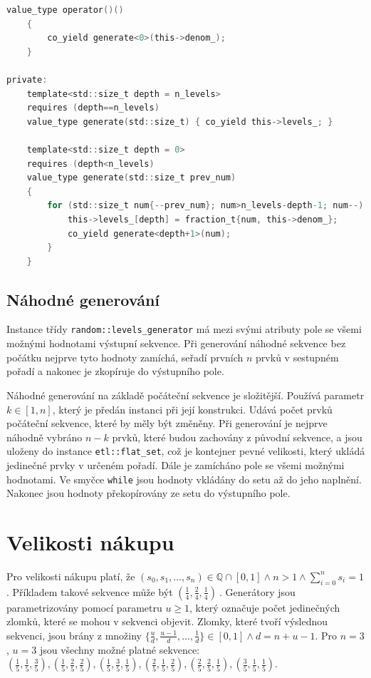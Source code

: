 \begin{lstlisting}[caption={~Metody pro systematické generování úrovní nákupu},label={lst:systematic:levels_generator},captionpos=t,abovecaptionskip=-\medskipamount,belowcaptionskip=\medskipamount,language=C]
    value_type operator()()
    {
        co_yield generate<0>(this->denom_);
    }

private:
    template<std::size_t depth = n_levels>
    requires (depth==n_levels)
    value_type generate(std::size_t) { co_yield this->levels_; }
    
    template<std::size_t depth = 0>
    requires (depth<n_levels)
    value_type generate(std::size_t prev_num)
    {
        for (std::size_t num{--prev_num}; num>n_levels-depth-1; num--) {
            this->levels_[depth] = fraction_t{num, this->denom_};
            co_yield generate<depth+1>(num);
        }
    }
\end{lstlisting}

\subsection{Náhodné generování}
Instance třídy \texttt{random::levels\_generator} má mezi svými atributy pole se všemi možnými hodnotami výstupní sekvence.
Při generování náhodné sekvence bez počátku nejprve tyto hodnoty zamíchá, seřadí prvních $n$ prvků v sestupném pořadí a nakonec je zkopíruje do výstupního pole.

Náhodné generování na základě počáteční sekvence je složitější.
Používá parametr $k \in [1, n] $, který je předán instanci při její konstrukci.
Udává počet prvků počáteční sekvence, které by měly být změněny.
Při generování je nejprve náhodně vybráno $n-k$ prvků, které budou zachovány z původní sekvence, a jsou uloženy do instance \texttt{etl::flat\_set}, což je kontejner pevné velikosti, který ukládá jedinečné prvky v určeném pořadí.
Dále je zamícháno pole se všemi možnými hodnotami.
Ve smyčce \texttt{while} jsou hodnoty vkládány do setu až do jeho naplnění.
Nakonec jsou hodnoty překopírovány ze setu do výstupního pole.

\section{Velikosti nákupu}
Pro velikosti nákupu platí, že $ (s_0, s_1,\dots,s_n) \in \mathbb{Q} \cap [0, 1] \land n>1 \land \sum_{i=0}^{n} s_i = 1 $.
Příkladem takové sekvence může být $ (\frac{1}{4}, \frac{2}{4}, \frac{1}{4})\ $.
Generátory jsou parametrizovány pomocí parametru $u\geq 1$, který označuje počet jedinečných zlomků, které se mohou v sekvenci objevit.
Zlomky, které tvoří výslednou sekvenci, jsou brány z množiny $\{\frac{u}{d}, \frac{u-1}{d},\dots, \frac{1}{d}\} \in [0, 1] \land d=n+u-1$.
Pro $n=3$, $u=3$ jsou všechny možné platné sekvence: $(\frac{1}{5}, \frac{1}{5}, \frac{3}{5}), (\frac{1}{5}, \frac{2}{5}, \frac{2}{5}), (\frac{1}{5}, \frac{3}{5}, \frac{1}{5}), (\frac{2}{5}, \frac{1}{5}, \frac{2}{5}), (\frac{2}{5}, \frac{2}{5}, \frac{1}{5}), (\frac{3}{5}, \frac{1}{5}, \frac{1}{5})$.

